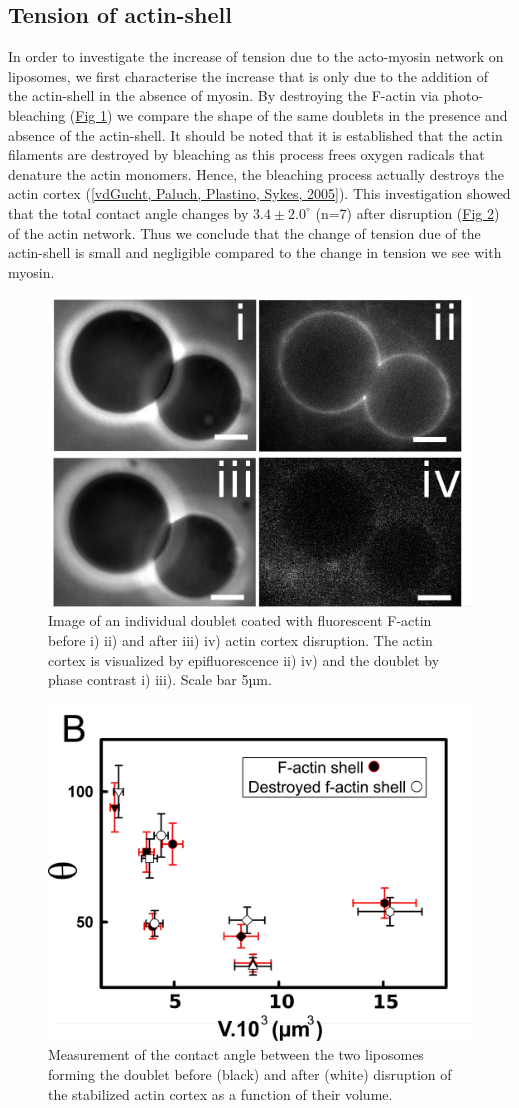 \documentclass[A4paperpaper,11pt,english]{sphinxmanual}
\begin{document}
\subsection{Tension of actin-shell}
\label{index-latex:tension-of-actin-shell}
In order to investigate the increase of tension due to the acto-myosin network
on liposomes, we first characterise the increase that is only due to the addition of the actin-shell in
the absence of myosin. By destroying the F-actin via photo-bleaching (\hyperref[index-latex:fig2a]{Fig  \ref*{index-latex:fig2a}}) we compare the shape of the
same doublets in the presence and absence of the actin-shell. It should be noted that it is established that the
actin filaments are destroyed by bleaching as this process frees oxygen radicals that denature the actin monomers. Hence, the bleaching process
actually destroys the actin cortex ({\hyperref[index-latex:vandergucht2005]{{[}vdGucht, Paluch, Plastino, Sykes,  2005{]}}}).
This investigation showed that the total contact
angle changes by \(3.4 \pm 2.0 ^{\circ}\) (n=7) after disruption (\hyperref[index-latex:fig2b]{Fig  \ref*{index-latex:fig2b}}) of the actin network.
Thus we conclude that the change of tension due of the actin-shell is small and negligible
compared to the change in tension we see with myosin.
\begin{figure}[htbp]
\centering
\capstart

\includegraphics[width=0.500\linewidth]{Fig_02-A.png}
\caption{Image of an individual doublet coated with fluorescent F-actin before i) ii) and
after iii) iv) actin cortex disruption. The actin cortex is visualized by
epifluorescence ii) iv) and the doublet by phase contrast i) iii). Scale
bar 5µm.}\label{index-latex:fig2a}\end{figure}
\begin{figure}[htbp]
\centering
\capstart

\includegraphics[width=0.500\linewidth]{Fig_02-B.png}
\caption{Measurement of the contact angle between the two liposomes forming the
doublet before (black) and after (white) disruption of the stabilized actin
cortex as a function of their volume.}\label{index-latex:fig2b}\end{figure}
\end{document}
